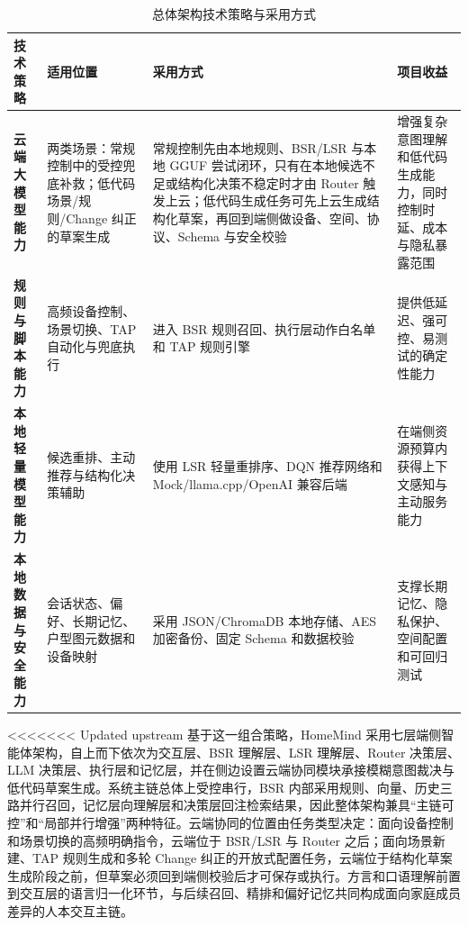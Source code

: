 \documentclass[12pt,a4paper,oneside]{ctexrep}
\begin{document}
\begin{table}[H]
    \centering
    \caption{总体架构技术策略与采用方式}
    \label{tab:architecture-choice}
    \begin{tabularx}{\textwidth}{>{\bfseries}p{2.7cm}X X X}
        \toprule
        技术策略 & 适用位置 & 采用方式 & 项目收益 \\
        \midrule
        云端大模型能力 & 两类场景：常规控制中的受控兜底补救；低代码场景/规则/Change 纠正的草案生成 & 常规控制先由本地规则、BSR/LSR 与本地 GGUF 尝试闭环，只有在本地候选不足或结构化决策不稳定时才由 Router 触发上云；低代码生成任务可先上云生成结构化草案，再回到端侧做设备、空间、协议、Schema 与安全校验 & 增强复杂意图理解和低代码生成能力，同时控制时延、成本与隐私暴露范围 \\
        规则与脚本能力 & 高频设备控制、场景切换、TAP 自动化与兜底执行 & 进入 BSR 规则召回、执行层动作白名单和 TAP 规则引擎 & 提供低延迟、强可控、易测试的确定性能力 \\
        本地轻量模型能力 & 候选重排、主动推荐与结构化决策辅助 & 使用 LSR 轻量重排序、DQN 推荐网络和 Mock/llama.cpp/OpenAI 兼容后端 & 在端侧资源预算内获得上下文感知与主动服务能力 \\
        本地数据与安全能力 & 会话状态、偏好、长期记忆、户型图元数据和设备映射 & 采用 JSON/ChromaDB 本地存储、AES 加密备份、固定 Schema 和数据校验 & 支撑长期记忆、隐私保护、空间配置和可回归测试 \\
        \bottomrule
    \end{tabularx}
\end{table}

<<<<<<< Updated upstream
基于这一组合策略，HomeMind 采用七层端侧智能体架构，自上而下依次为交互层、BSR 理解层、LSR 理解层、Router 决策层、LLM 决策层、执行层和记忆层，并在侧边设置云端协同模块承接模糊意图裁决与低代码草案生成。系统主链总体上受控串行，BSR 内部采用规则、向量、历史三路并行召回，记忆层向理解层和决策层回注检索结果，因此整体架构兼具“主链可控”和“局部并行增强”两种特征。云端协同的位置由任务类型决定：面向设备控制和场景切换的高频明确指令，云端位于 BSR/LSR 与 Router 之后；面向场景新建、TAP 规则生成和多轮 Change 纠正的开放式配置任务，云端位于结构化草案生成阶段之前，但草案必须回到端侧校验后才可保存或执行。方言和口语理解前置到交互层的语言归一化环节，与后续召回、精排和偏好记忆共同构成面向家庭成员差异的人本交互主链。
\end{document}
